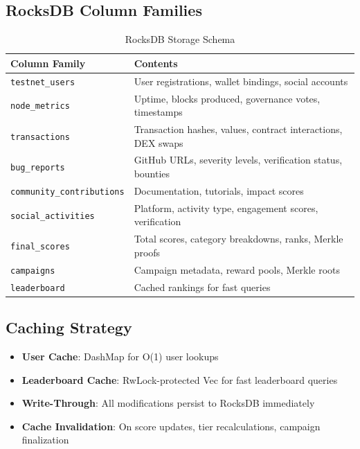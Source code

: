 \documentclass[11pt,a4paper]{article}
\begin{document}
\subsection{RocksDB Column Families}

\begin{table}[h]
\centering
\begin{tabular}{|l|p{8cm}|}
\hline
\textbf{Column Family} & \textbf{Contents} \\ \hline
\texttt{testnet\_users} & User registrations, wallet bindings, social accounts \\ \hline
\texttt{node\_metrics} & Uptime, blocks produced, governance votes, timestamps \\ \hline
\texttt{transactions} & Transaction hashes, values, contract interactions, DEX swaps \\ \hline
\texttt{bug\_reports} & GitHub URLs, severity levels, verification status, bounties \\ \hline
\texttt{community\_contributions} & Documentation, tutorials, impact scores \\ \hline
\texttt{social\_activities} & Platform, activity type, engagement scores, verification \\ \hline
\texttt{final\_scores} & Total scores, category breakdowns, ranks, Merkle proofs \\ \hline
\texttt{campaigns} & Campaign metadata, reward pools, Merkle roots \\ \hline
\texttt{leaderboard} & Cached rankings for fast queries \\ \hline
\end{tabular}
\caption{RocksDB Storage Schema}
\end{table}

\subsection{Caching Strategy}

\begin{itemize}
    \item \textbf{User Cache}: DashMap for O(1) user lookups
    \item \textbf{Leaderboard Cache}: RwLock-protected Vec for fast leaderboard queries
    \item \textbf{Write-Through}: All modifications persist to RocksDB immediately
    \item \textbf{Cache Invalidation}: On score updates, tier recalculations, campaign finalization
\end{itemize}
\end{document}
